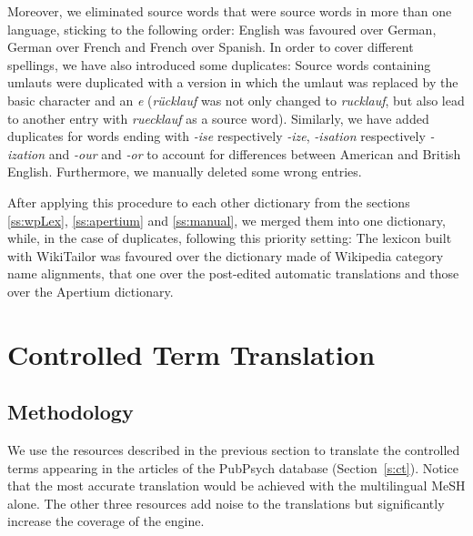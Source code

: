 \documentclass[a4paper,11pt]{article}
\begin{document}
	Moreover, we eliminated source words that were source words in more than one language, sticking to the following order: English was favoured over German, German over French and French over Spanish. In order to cover different spellings, we have also introduced some duplicates: Source words containing umlauts were duplicated with a version in which the umlaut was replaced by the basic character and an \textit{e} (\textit{rücklauf} was not only changed to \textit{rucklauf}, but also lead to another entry with \textit{ruecklauf} as a source word). Similarly, we have added duplicates for words ending with \textit{-ise} respectively \textit{-ize}, \mbox{\textit{-isation}} respectively \textit{-ization} and \textit{-our} and \textit{-or} to account for differences between American and British English. 	Furthermore, we manually deleted some wrong entries. 
	
	After applying this procedure to each other dictionary from the sections \ref{ss:wpLex}, \ref{ss:apertium} and \ref{ss:manual}, we merged them into one dictionary, while, in the case of duplicates, following this priority setting: The lexicon built with WikiTailor was favoured over the dictionary made of Wikipedia category name alignments, that one over the post-edited automatic translations and those over the Apertium dictionary.
		
	\section{Controlled Term Translation}
	\label{s:cttrad}
	
	\subsection{Methodology}
	We use the resources described in the previous section to translate the controlled terms appearing in the articles of the PubPsych database (Section~\ref{s:ct}).
	Notice that the most accurate translation would be achieved with the multilingual MeSH alone. The other three resources add noise to the translations but significantly increase the coverage of the engine.
	
\end{document}
